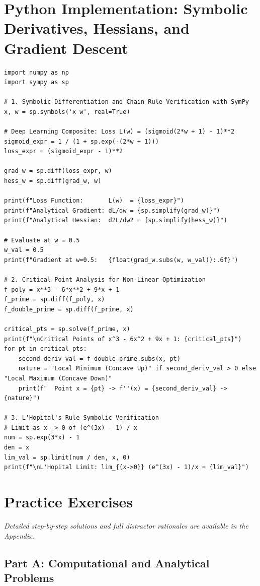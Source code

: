 \section{Python Implementation: Symbolic Derivatives, Hessians, and Gradient Descent}

\begin{lstlisting}[caption={Symbolic Calculus and Optimization in Python}]
import numpy as np
import sympy as sp

# 1. Symbolic Differentiation and Chain Rule Verification with SymPy
x, w = sp.symbols('x w', real=True)

# Deep Learning Composite: Loss L(w) = (sigmoid(2*w + 1) - 1)**2
sigmoid_expr = 1 / (1 + sp.exp(-(2*w + 1)))
loss_expr = (sigmoid_expr - 1)**2

grad_w = sp.diff(loss_expr, w)
hess_w = sp.diff(grad_w, w)

print(f"Loss Function:       L(w)  = {loss_expr}")
print(f"Analytical Gradient: dL/dw = {sp.simplify(grad_w)}")
print(f"Analytical Hessian:  d2L/dw2 = {sp.simplify(hess_w)}")

# Evaluate at w = 0.5
w_val = 0.5
print(f"Gradient at w=0.5:   {float(grad_w.subs(w, w_val)):.6f}")

# 2. Critical Point Analysis for Non-Linear Optimization
f_poly = x**3 - 6*x**2 + 9*x + 1
f_prime = sp.diff(f_poly, x)
f_double_prime = sp.diff(f_prime, x)

critical_pts = sp.solve(f_prime, x)
print(f"\nCritical Points of x^3 - 6x^2 + 9x + 1: {critical_pts}")
for pt in critical_pts:
    second_deriv_val = f_double_prime.subs(x, pt)
    nature = "Local Minimum (Concave Up)" if second_deriv_val > 0 else "Local Maximum (Concave Down)"
    print(f"  Point x = {pt} -> f''(x) = {second_deriv_val} -> {nature}")

# 3. L'Hopital's Rule Symbolic Verification
# Limit as x -> 0 of (e^(3x) - 1) / x
num = sp.exp(3*x) - 1
den = x
lim_val = sp.limit(num / den, x, 0)
print(f"\nL'Hopital Limit: lim_{{x->0}} (e^(3x) - 1)/x = {lim_val}")
\end{lstlisting}

\newpage
\section{Practice Exercises}
\textit{Detailed step-by-step solutions and full distractor rationales are available in the Appendix.}

\subsection*{Part A: Computational and Analytical Problems}

